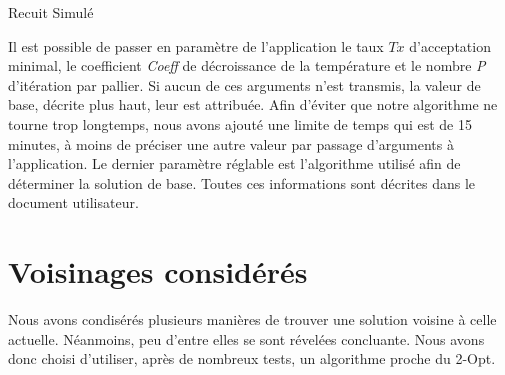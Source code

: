 \documentclass{article}
\begin{document}
\begin{algorithm}[H]
	\SetAlgoLined
	\caption{Recuit Simulé}
\end{algorithm}

Il est possible de passer en paramètre de l'application le taux \emph{$Tx$} d'acceptation minimal,
le coefficient \emph{Coeff} de décroissance de la température et le nombre \emph{P} d'itération par pallier.
Si aucun de ces arguments n'est transmis, la valeur de base, décrite plus haut, leur est attribuée.
Afin d'éviter que notre algorithme ne tourne trop longtemps, nous avons ajouté une limite de temps qui est de 15 minutes, à moins de préciser une autre valeur par passage d'arguments à l'application.
Le dernier paramètre réglable est l'algorithme utilisé afin de déterminer la solution de base.
Toutes ces informations sont décrites dans le document utilisateur.

\section{Voisinages considérés}

Nous avons condisérés plusieurs manières de trouver une solution voisine à celle actuelle. Néanmoins, peu d'entre elles se sont révelées concluante. Nous avons donc choisi d'utiliser, après de nombreux tests, un algorithme proche du 2-Opt.
\end{document}
